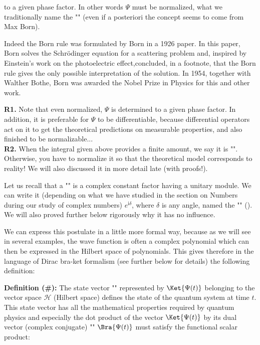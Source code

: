 	to a given phase factor. In other words $\Psi$ must be normalized, what we traditionally name the "\label{de broglie normalization condition}" (even if a posteriori the concept seems to come from Max Born).
	
	Indeed the Born rule was formulated by Born in a 1926 paper. In this paper, Born solves the Schrödinger equation for a scattering problem and, inspired by Einstein's work on the photoelectric effect,concluded, in a footnote, that the Born rule gives the only possible interpretation of the solution. In 1954, together with Walther Bothe, Born was awarded the Nobel Prize in Physics for this and other work.
	\begin{tcolorbox}[title=Remarks,colframe=black,arc=10pt]
	\textbf{R1.} Note that even normalized, $\Psi$ is determined to a given phase factor. In addition, it is preferable for $\Psi$ to be differentiable, because differential operators act on it to get the theoretical predictions on measurable properties, and also finished to be normalizable...\\
	
	\textbf{R2.} When the integral given above provides a finite amount, we say it is "". Otherwise, you have to normalize it so that the theoretical model corresponds to reality! We will also discussed it in more detail late (with proofs!). 
	\end{tcolorbox}
	
	Let us recall that a "" is a complex constant factor having a unitary module. We can write it (depending on what we have studied in the section on Numbers during our study of complex numbers) $e^{\mathrm{i}\delta}$, where $\delta$ is any angle, named the "" (). We will also proved further below rigorously why it has no influence.
	
	We can express this postulate in a little more formal way, because as we will see in several examples, the wave function is often a complex polynomial which can then be expressed in the Hilbert space of polynomials. This gives therefore in the language of Dirac bra-ket formalism (see further below for details) the following definition:
	
	\textbf{Definition (\#\mydef):} The state vector "" represented by $\Ket{\Psi(t)}$ belonging to the vector space $\mathcal{H}$ (Hilbert space) defines the state of the quantum system at time $t$. This state vector has all the mathematical properties required by quantum physics and especially the dot product of the vector $\Ket{\Psi(t)}$ by its dual vector (complex conjugate) "" $\Bra{\Psi(t)}$ must satisfy the functional scalar product:
	
